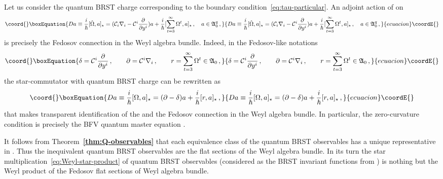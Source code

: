 \documentclass[a4paper,11pt,oneside]{amsart}
\theoremstyle{plain}
\numberwithin{equation}{section} %
\numberwithin{figure}{section} %
\providecommand{\bref}[1]{{\bf \ref{#1}}}
\providecommand{\qcommut}[2]{[#1,#2]_\star}
\def\d{\partial}
\providecommand{\dl}[1]{\displaystyle\frac{{\d}}{\d #1}}
\def\cc{{\mathcal C}}
\def\aA{{ \mathfrak A}}
\begin{document}
\noindent
Let us consider the quantum BRST charge \myHighlight{$\hat\Omega$}\coordHE{}
corresponding to the boundary condition~\eqref{eq:tau-particular}.  An
adjoint action of \myHighlight{$\hat\Omega$}\coordHE{} on \myHighlight{$\aA^q_0$}\coordHE{}
\begin{equation}\coord{}\boxEquation{
Da \equiv \frac{i}{\hbar}\qcommut{\hat\Omega}{a}=
(\cc_i\nabla_i-\cc^i\dl{y^i})a+\frac{i}{\hbar}
\qcommut{\sum^\infty_{t=3} \Omega^t}{a}\,,
\quad a\in\aA^q_0\,,
}{
Da \equiv \frac{i}{\hbar}\qcommut{\hat\Omega}{a}=
(\cc_i\nabla_i-\cc^i\dl{y^i})a+\frac{i}{\hbar}
\qcommut{\sum^\infty_{t=3} \Omega^t}{a}\,,
\quad a\in\aA^q_0\,,
}{ecuacion}\coordE{}\end{equation}
is precisely the Fedosov connection in the Weyl algebra
bundle.  Indeed, in the Fedosov-like notations
\begin{equation}\coord{}\boxEquation{
  \label{eq:fedosov}
  \delta=\cc^i\dl{y^i}\,,\qquad
  \partial=\cc^i \nabla_i\,,\qquad
  r=\sum_{t=3}^\infty \Omega^t \in \aA_0\,,
}{
  \delta=\cc^i\dl{y^i}\,,\qquad
  \partial=\cc^i \nabla_i\,,\qquad
  r=\sum_{t=3}^\infty \Omega^t \in \aA_0\,,
}{ecuacion}\coordE{}\end{equation}
the star-commutator with quantum BRST charge \myHighlight{$\hat\Omega$}\coordHE{}
can be rewritten as
\begin{equation}\coord{}\boxEquation{
Da \equiv \frac{i}{\hbar}\qcommut{\Omega}{a}=
(\partial-\delta)a+\frac{i}{\hbar}\qcommut{r}{a}\,,
}{
Da \equiv \frac{i}{\hbar}\qcommut{\Omega}{a}=
(\partial-\delta)a+\frac{i}{\hbar}\qcommut{r}{a}\,,
}{ecuacion}\coordE{}\end{equation}
that makes transparent identification of the
\myHighlight{$\frac{i}{\hbar}\qcommut{\hat\Omega}{\cdot\,}$}\coordHE{} and the
Fedosov connection in the Weyl algebra bundle.  In
particular, the zero-curvature condition is precisely
the BFV quantum master equation
\myHighlight{$\qcommut{\hat\Omega}{\hat\Omega}=0$}\coordHE{}.

\noindent
It follows from Theorem~\bref{thm:Q-observables} that
each equivalence class of the quantum BRST observables has
a unique representative in \myHighlight{$\aA^q_0$}\coordHE{}.  Thus the inequivalent
quantum BRST observables are the flat sections of the
Weyl algebra bundle.  In its turn the star
multiplication~\eqref{eq:Weyl-star-product} of quantum
BRST observables (considered as the BRST invariant
functions from \myHighlight{$\aA_0^q$}\coordHE{}) is nothing but the Weyl
product of the Fedosov flat sections of Weyl algebra bundle.
\end{document}
